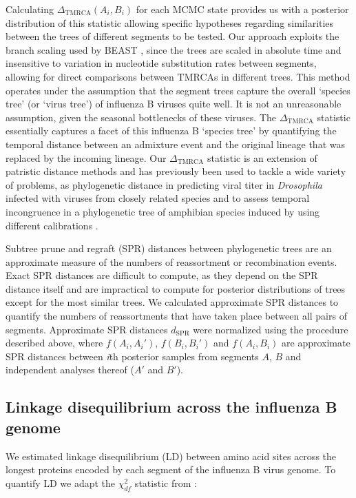 \documentclass[11pt,oneside,letterpaper]{article}
\newcommand{\chiSq}{\chi^{2}_{df}}
\newcommand{\dtmrca}{\Delta_\mathrm{TMRCA}}
\newcommand{\dspr}{d_\mathrm{SPR}}
\begin{document}
Calculating $\dtmrca(A_i, B_i)$ for each MCMC state provides us with a posterior distribution of this statistic allowing  specific hypotheses regarding similarities between the trees of different segments to be tested.
Our approach exploits the branch scaling used by BEAST \cite{drummond2012}, since the trees are scaled in absolute time and insensitive to variation in nucleotide substitution rates between segments, allowing for direct comparisons between TMRCAs in different trees.
This method operates under the assumption that the segment trees capture the overall `species tree' (or `virus tree') of influenza B viruses quite well.
It is not an unreasonable assumption, given the seasonal bottlenecks of these viruses.
The $\dtmrca$ statistic essentially captures a facet of this influenza B `species tree' by quantifying the temporal distance between an admixture event and the original lineage that was replaced by the incoming lineage.
Our $\dtmrca$ statistic is an extension of patristic distance methods and has previously been used to tackle a wide variety of problems, as phylogenetic distance in predicting viral titer in \textit{Drosophila} infected with viruses from closely related species \cite{longdon2011} and to assess temporal incongruence in a phylogenetic tree of amphibian species induced by using different calibrations \cite{ruane2011}.

Subtree prune and regraft (SPR) distances between phylogenetic trees are an approximate measure of the numbers of reassortment or recombination events.
Exact SPR distances are difficult to compute, as they depend on the SPR distance itself and are impractical to compute for posterior distributions of trees except for the most similar trees.
We calculated approximate SPR distances \cite{whidden2009,whidden2010,whidden2013} to quantify the numbers of reassortments that have taken place between all pairs of segments.
Approximate SPR distances $\dspr$ were normalized using the procedure described above, where $f(A_i, A_i')$, $f(B_i, B_i')$ and $f(A_i, B_i)$ are approximate SPR distances between \textit{i}th posterior samples from segments $A$, $B$ and independent analyses thereof ($A'$ and $B'$).

\subsection*{Linkage disequilibrium across the influenza B genome}
We estimated linkage disequilibrium (LD) between amino acid sites across the longest proteins encoded by each segment of the influenza B virus genome.
To quantify LD we adapt the $\chiSq$ statistic from \cite{hedrick1986}:
\end{document}
